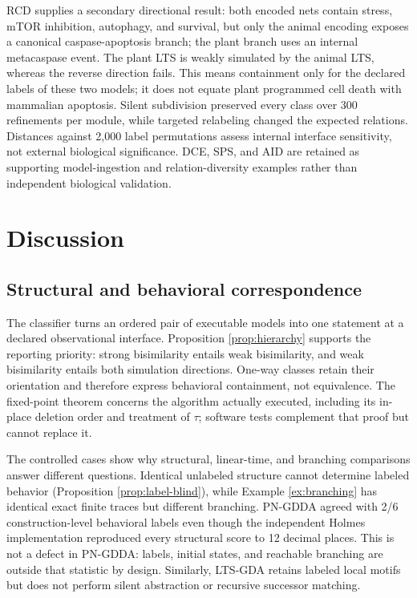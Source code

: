 \documentclass{ws-jbcb}
\numberwithin{equation}{section}
\newcommand{\TAU}{\tau}
\begin{document}
RCD supplies a secondary directional result: both encoded nets contain stress,
mTOR inhibition, autophagy, and survival, but only the animal encoding exposes a
canonical caspase-apoptosis branch; the plant branch uses an internal metacaspase
event. The plant LTS is weakly simulated by the animal LTS, whereas the reverse
direction fails. This means containment only for the declared labels of these
two models; it does not equate plant programmed cell death with mammalian
apoptosis. Silent subdivision preserved every class over 300 refinements per
module, while targeted relabeling changed the expected relations. Distances
against 2,000 label permutations assess internal interface sensitivity, not
external biological significance. DCE, SPS, and AID are retained as supporting
model-ingestion and relation-diversity examples rather than independent
biological validation.

\section{Discussion}\label{sec:discussion}

\subsection{Structural and behavioral correspondence}
\label{sec:discussion-meaning}

The classifier turns an ordered pair of executable models into one statement at
a declared observational interface. Proposition \ref{prop:hierarchy} supports
the reporting priority: strong bisimilarity entails weak bisimilarity, and weak
bisimilarity entails both simulation directions. One-way classes retain their
orientation and therefore express behavioral containment, not equivalence. The
fixed-point theorem concerns the algorithm actually executed, including its
in-place deletion order and treatment of $\TAU$; software tests complement that
proof but cannot replace it.

The controlled cases show why structural, linear-time, and branching
comparisons answer different questions. Identical unlabeled structure cannot
determine labeled behavior (Proposition \ref{prop:label-blind}), while Example
\ref{ex:branching} has identical exact finite traces but different branching.
PN-GDDA agreed with 2/6 construction-level behavioral labels even though the
independent Holmes implementation reproduced every structural score to 12
decimal places. This is not a defect in PN-GDDA: labels, initial states, and
reachable branching are outside that statistic by design. Similarly, LTS-GDA
retains labeled local motifs but does not perform silent abstraction or
recursive successor matching.
\end{document}
